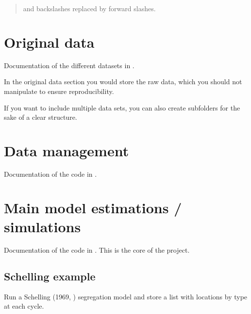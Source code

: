\documentclass[a4paper,11pt,english]{sphinxmanual}
\begin{document}
\begin{quote}
\begin{fulllineitems}
%
\begin{sphinxVerbatim}[commandchars=\\\{\}]
\PYG{p}{[}\PYG{p}{]} 
\end{sphinxVerbatim}

and backslashes replaced by forward slashes.

\end{fulllineitems}

\end{quote}


\chapter{Original data}
\label{\detokenize{original_data:original-data}}\label{\detokenize{original_data:id1}}\label{\detokenize{original_data::doc}}
Documentation of the different datasets in .

In the original data section you would store the raw data, which you should not manipulate to ensure reproducibility.

If you want to include multiple data sets, you can also create subfolders for the sake of a clear structure.


\chapter{Data management}
\label{\detokenize{data_management:data-management}}\label{\detokenize{data_management:id1}}\label{\detokenize{data_management::doc}}
Documentation of the code in .


\chapter{Main model estimations / simulations}
\label{\detokenize{analysis:main-model-estimations-simulations}}\label{\detokenize{analysis:analysis}}\label{\detokenize{analysis::doc}}
Documentation of the code in . This is the core of the project.


\section{Schelling example}
\label{\detokenize{analysis:module-src.analysis.schelling}}\label{\detokenize{analysis:schelling-example}}
Run a Schelling (1969, ) segregation
model and store a list with locations by type at each cycle.
\end{document}
